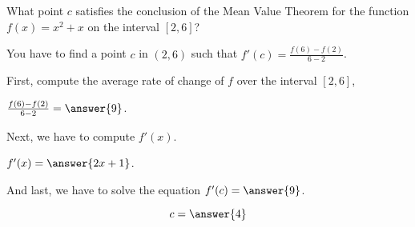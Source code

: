 \documentclass{ximera}
\author{Steven Gubkin\and Nela Lakos}
\begin{document}
\begin{exercise}

What point $c$ satisfies the conclusion of the Mean Value Theorem for the function $f(x) = x^2 +x$ on the interval
$[2,6]$?
\begin{hint}
You have to find a point $c$ in $(2,6)$ such that $f'(c)=\frac{f(6)-f(2)}{6-2}$.
\end{hint}
\begin{hint}
First, compute the average rate of change of $f$ over the interval $[2,6]$,

$\frac{f(6)-f(2)}{6-2}=\answer{9}$.
\end{hint}
\begin{hint}
Next, we have to compute $f'(x)$.

$f'(x)=\answer{2x+1}$.
\end{hint}
\begin{hint}
And last, we have to solve the equation
$f'(c)=\answer{9}$.
\end{hint}
\begin{prompt}
	$$c = \answer{4}$$
\end{prompt}

\end{exercise}
\end{document}

